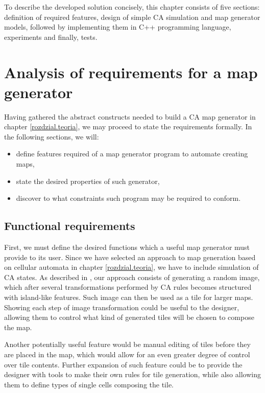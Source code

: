 \documentclass[12pt]{report}
\begin{document}
To describe the developed solution concisely, this chapter consists of five sections: definition of required features, design of simple CA simulation and map generator models, followed by implementing them in C++ programming language, experiments and finally, tests.

\section{Analysis of requirements for a map generator}

Having gathered the abstract constructs needed to build a CA map generator in chapter \ref{rozdzial.teoria}, we may proceed to state the requirements formally. In the following sections, we will: 
\begin{itemize}
	\item define features required of a map generator program to automate creating maps,
	\item state the desired properties of such generator,
	\item discover to what constraints such program may be required to conform.
\end{itemize}

\subsection{Functional requirements}

First, we must define the desired functions which a useful map generator must provide to its user.
Since we have selected an approach to map generation based on cellular automata in chapter \ref{rozdzial.teoria}, we have to include simulation of CA states. As described in \autocite{johnson2010cellular}, our approach consists of generating a random image, which after several transformations performed by CA rules becomes structured with island-like features. Such image can then be used as a tile for larger maps. Showing each step of image transformation could be useful to the designer, allowing them to control what kind of generated tiles will be chosen to compose the map. 

Another potentially useful feature would be manual editing of tiles before they are placed in the map, which would allow for an even greater degree of control over tile contents. Further expansion of such feature could be to provide the designer with tools to make their own rules for tile generation, while also allowing them to define types of single cells composing the tile.
\end{document}
